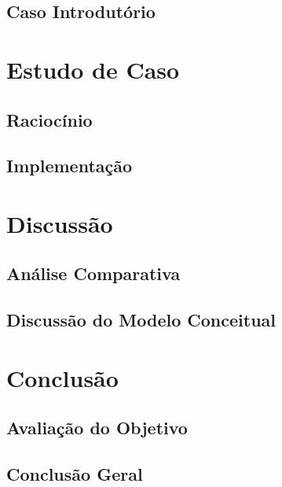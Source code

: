\documentclass[openright]{normas-utf-tex} %
\begin{document}
	\section{Caso Introdutório} \label{introdutorycase}
			

\chapter{Estudo de Caso} \label{casestudy}
\label{studycase}
	
	\section{Raciocínio} \label{rac}
		
	\section{Implementação} \label{validation}
		
\chapter{Discussão}
\label{chap:disc}
	
	\section{Análise Comparativa}\label{analisecomparativa}
		
			
		
		
		
	\section{Discussão do Modelo Conceitual}\label{constresult}
		
\label{chap:anacomp}
\chapter{Conclusão}
\label{chap:conc}
	
	\section{Avaliação do Objetivo}
		
	\section{Conclusão Geral}
		
\end{document}
